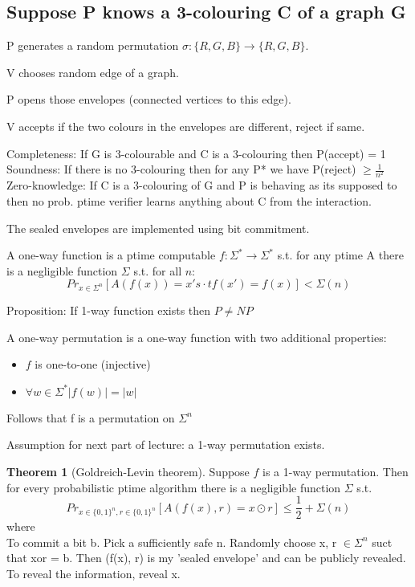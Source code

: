 \documentclass[a4paper,12pt]{article}
\theoremstyle{definition}
\newtheorem{theorem}[counter]{Theorem}
\theoremstyle{remark}
\begin{document}
\subsection*{Suppose P knows a 3-colouring C of a graph G}

P generates a random permutation $\sigma: \{R, G, B\} \to \{R, G, B\}$.

V chooses random edge of a graph.

P opens those envelopes (connected vertices to this edge).

V accepts if the two colours in the envelopes are different, reject if same.

Completeness: If G is 3-colourable and C is a 3-colouring then P(accept) = 1
Soundness: If there is no 3-colouring then for any P* we have P(reject) $\geq \frac{1}{n^2}$
Zero-knowledge: If C is a 3-colouring of G and P is behaving as its supposed to then no prob. ptime verifier 
learns anything about C from the interaction.

The sealed envelopes are implemented using bit commitment.

A one-way function is a ptime computable $f: \Sigma^* \to \Sigma^*$ s.t. for any ptime A there is a negligible function
$\Sigma$ s.t. for all $n$:
\begin{equation*}
    Pr_{x \in \Sigma^n} [A(f(x)) = x' s \cdot t f(x') = f(x)] < \Sigma(n)
\end{equation*}

Proposition: If 1-way function exists then $P \neq NP$

A one-way permutation is a one-way function with two additional properties:
\begin{itemize}
    \item $f$ is one-to-one (injective)
    \item $\forall w \in \Sigma^* |f(w)| = |w|$
\end{itemize}

Follows that f is a permutation on $\Sigma^n$ %

Assumption for next part of lecture: a 1-way permutation exists.

\begin{theorem}[Goldreich-Levin theorem]
    Suppose $f$ is a 1-way permutation. Then for every probabilistic ptime algorithm there is a negligible function 
    $\Sigma$ s.t.
    \begin{equation*}
        Pr_{x \in \{0, 1\}^n, r \in \{0, 1\}^n} [A(f(x), r) = x \odot r] \leq \frac{1}{2} + \Sigma(n)
    \end{equation*}
    where
    \begin{equation*}
        [x \odot r = \sum_{i=1}^{n} x_i r_i mod 2]
    \end{equation*}
    To commit a bit b. 
    Pick a sufficiently safe n.
    Randomly choose x, r $\in \Sigma^n$ suct that xor = b.
    Then (f(x), r) is my 'sealed envelope' and can be publicly revealed.
    To reveal the information, reveal x.
\end{theorem}
\end{document}
